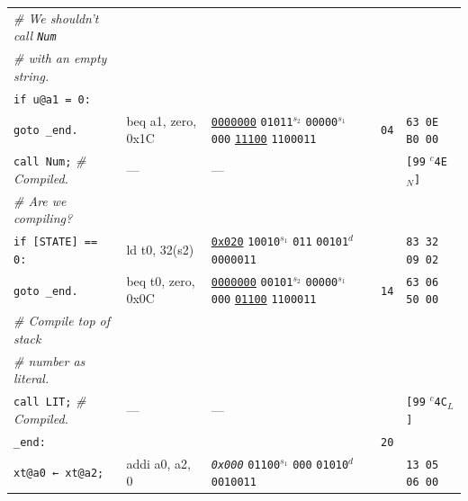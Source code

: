 \documentclass[a4paper,12pt,final]{article}
\begin{document}
\begin{table}[!htbp]
\begin{adjustwidth}{-1cm}{-1cm}
\begin{center}
\begin{tabular}{l|ll|l|l}
\hspace{1.053000em} \emph{\# We shouldn't call \texttt{Num}} &  &  &  & \\[0pt]
\hspace{1.053000em} \emph{\# with an empty string.} &  &  &  & \\[0pt]
\hspace{1.053000em} \texttt{if u@a1 = 0:} &  &  &  & \\[0pt]
\hspace{2.106000em}   \texttt{goto \_end.} & beq a1, zero, 0x1C & \uline{\texttt{0000000}} \texttt{01011}​\(^{s_{2}}\) \texttt{00000}​\(^{s_{1}}\) \texttt{000} \uline{\texttt{11100}} \texttt{1100011} & \texttt{04} & \texttt{63 0E B0 00}\\[0pt]
\hspace{1.053000em} \texttt{call Num;}  \emph{\# Compiled.} & --- & --- &  & \texttt{[99} \(^{c}\)​\texttt{4E}​\(_{N}\)​\texttt{]}\\[0pt]
\hspace{1.053000em} \emph{\# Are we compiling?} &  &  &  & \\[0pt]
\hspace{1.053000em} \texttt{if [STATE] == 0:} & ld t0, 32(s2) & \uline{\texttt{0x020}}                    \texttt{10010}​\(^{s_{1}}\) \texttt{011} \texttt{00101}​\(^{d}\)  \texttt{0000011} &  & \texttt{83 32 09 02}\\[0pt]
\hspace{2.106000em}   \texttt{goto \_end.} & beq t0, zero, 0x0C & \uline{\texttt{0000000}} \texttt{00101}​\(^{s_{2}}\) \texttt{00000}​\(^{s_{1}}\) \texttt{000} \uline{\texttt{01100}} \texttt{1100011} & \texttt{14} & \texttt{63 06 50 00}\\[0pt]
\hspace{1.053000em} \emph{\# Compile top of stack} &  &  &  & \\[0pt]
\hspace{1.053000em} \emph{\# number as literal.} &  &  &  & \\[0pt]
\hspace{1.053000em} \texttt{call LIT;}  \emph{\# Compiled.} & --- & --- &  & \texttt{[99} \(^{c}\)​\texttt{4C}​\(_{L}\)​\texttt{]}\\[0pt]
\texttt{\_end:} &  &  & \texttt{20} & \\[0pt]
\hspace{1.053000em} \texttt{xt@a0 ← xt@a2;} & addi a0, a2, 0 & \emph{\texttt{0x000}}                    \texttt{01100}​\(^{s_{1}}\) \texttt{000} \texttt{01010}​\(^{d}\)  \texttt{0010011} &  & \texttt{13 05 06 00}\\[0pt]

\end{tabular}
\end{center}
\end{adjustwidth}
\end{table}
\end{document}
